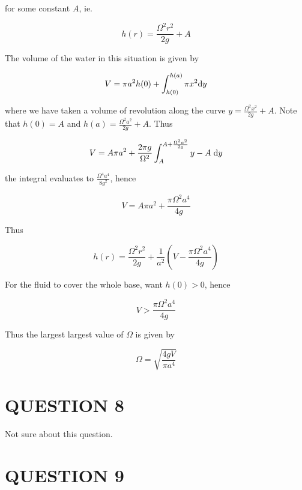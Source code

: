 \documentclass[a4paper]{article}
\begin{document}
for some constant $ A $, ie.

\[ h(r) = \frac{\Omega^{2}r^{2}}{2g} + A \]

The volume of the water in this situation is given by

\[ V = \pi a^{2} h(0) + \int_{h(0)}^{h(a)} \pi x^{2} \mathrm{d} y \]

where we have taken a volume of revolution along the curve $ y = \frac{\Omega^{2} x^{2}}{2g} + A $. Note that $ h(0) = A $ and $ h(a) = \frac{\Omega^{2}a^{2}}{2g} + A $. Thus

\[ V = A \pi a^{2} + \frac{2 \pi g}{\Omega^{2}} \int_{A}^{A + \frac{\Omega^{2}a^{2}}{2g}} y - A \; \mathrm{d} y \]

the integral evaluates to $ \frac{\Omega^{4} a^{4}}{8 g^{2}} $, hence

\[ V = A \pi a^{2} + \frac{\pi \Omega^{2} a^{4}}{4 g} \]

Thus

\[ h(r) = \frac{\Omega^{2}r^{2}}{2g} + \frac{1}{a^{2}} \left( V  -  \frac{\pi \Omega^{2} a^{4}}{4 g} \right)  \]

For the fluid to cover the whole base, want $ h(0) > 0 $, hence

\[ V > \frac{\pi \Omega^{2} a^{4}}{4 g}  \]

Thus the largest largest value of $ \Omega $ is given by 


\[ \Omega = \sqrt{\frac{4gV}{\pi a^{4}}}   \]















\section{QUESTION 8}

Not sure about this question.
\section{QUESTION 9}
\end{document}
